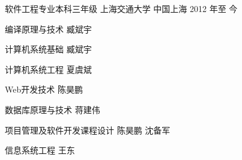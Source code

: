 

\begin{cventries}


  \cventry
    {软件工程专业本科三年级} %
    {上海交通大学} %
    {中国上海} %
    {2012 年至 今} %
    {
      \begin{cvitems} %
        \item 编译原理与技术 臧斌宇
        \item 计算机系统基础 臧斌宇
        \item 计算机系统工程 夏虞斌
        \item Web开发技术 陈昊鹏
        \item 数据库原理与技术 蒋建伟
        \item 项目管理及软件开发课程设计 陈昊鹏 沈备军
        \item 信息系统工程 王东 
      \end{cvitems}
    }
\end{cventries}
